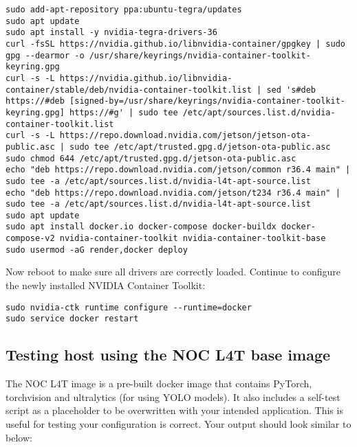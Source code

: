 \documentclass[11pt]{article}
\begin{document}


\lstset{style=console}
\begin{lstlisting}
sudo add-apt-repository ppa:ubuntu-tegra/updates
sudo apt update
sudo apt install -y nvidia-tegra-drivers-36
curl -fsSL https://nvidia.github.io/libnvidia-container/gpgkey | sudo gpg --dearmor -o /usr/share/keyrings/nvidia-container-toolkit-keyring.gpg
curl -s -L https://nvidia.github.io/libnvidia-container/stable/deb/nvidia-container-toolkit.list | sed 's#deb https://#deb [signed-by=/usr/share/keyrings/nvidia-container-toolkit-keyring.gpg] https://#g' | sudo tee /etc/apt/sources.list.d/nvidia-container-toolkit.list
curl -s -L https://repo.download.nvidia.com/jetson/jetson-ota-public.asc | sudo tee /etc/apt/trusted.gpg.d/jetson-ota-public.asc
sudo chmod 644 /etc/apt/trusted.gpg.d/jetson-ota-public.asc
echo "deb https://repo.download.nvidia.com/jetson/common r36.4 main" | sudo tee -a /etc/apt/sources.list.d/nvidia-l4t-apt-source.list
echo "deb https://repo.download.nvidia.com/jetson/t234 r36.4 main" | sudo tee -a /etc/apt/sources.list.d/nvidia-l4t-apt-source.list
sudo apt update
sudo apt install docker.io docker-compose docker-buildx docker-compose-v2 nvidia-container-toolkit nvidia-container-toolkit-base
sudo usermod -aG render,docker deploy
\end{lstlisting}

Now reboot to make sure all drivers are correctly loaded. Continue to configure the newly installed NVIDIA Container Toolkit:

\lstset{style=console}
\begin{lstlisting}
sudo nvidia-ctk runtime configure --runtime=docker
sudo service docker restart
\end{lstlisting}


\subsection{Testing host using the NOC L4T base image}

The NOC L4T image is a pre-built docker image that contains PyTorch, torchvision and ultralytics (for using YOLO models). It also includes a self-test script as a placeholder to be overwritten with your intended application. This is useful for testing your configuration is correct. Your output should look similar to below:
\end{document}
